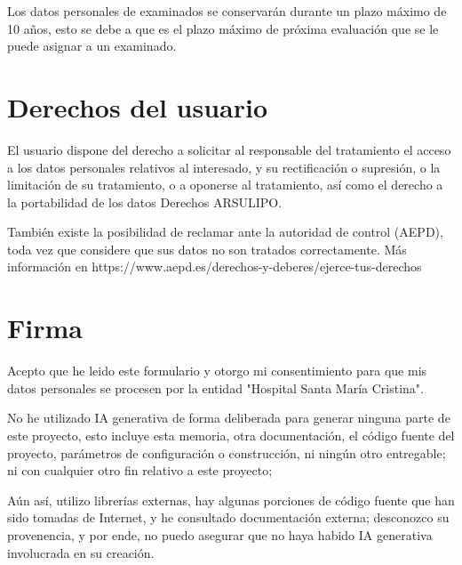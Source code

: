 \documentclass[12pt,a4paper,twoside,openright]{book}
\begin{document}
\begin{umaappendices}
Los datos personales de examinados se conservarán durante un plazo máximo de 10 años, esto se debe a que es el plazo máximo de próxima evaluación que se le puede asignar a un examinado.

\section{Derechos del usuario}

El usuario dispone del derecho a solicitar al responsable del tratamiento el acceso a los datos personales relativos al interesado, y su rectificación o supresión, o la limitación de su tratamiento, o a oponerse al tratamiento, así como el derecho a la portabilidad de los datos Derechos ARSULIPO.

También existe la posibilidad  de reclamar ante la autoridad de control (AEPD), toda vez que considere que sus datos no son tratados correctamente. Más información en https://www.aepd.es/derechos-y-deberes/ejerce-tus-derechos

\section{Firma}

Acepto que he leido este formulario y otorgo mi consentimiento para que mis datos personales se procesen por la entidad "Hospital Santa María Cristina".


No he utilizado IA generativa de forma deliberada para generar ninguna parte de este proyecto, esto incluye esta memoria, otra documentación, el código fuente del proyecto, parámetros de configuración o construcción, ni ningún otro entregable; ni con cualquier otro fin relativo a este proyecto; 

Aún así, utilizo librerías externas, hay algunas porciones de código fuente que han sido tomadas de Internet, y he consultado documentación externa; desconozco su provenencia, y por ende, no puedo asegurar que no haya habido IA generativa involucrada en su creación.

\end{umaappendices}

\backmatter
\printbibliography[title={Bibliografía}]
\cleardoublepage
\MakeUMABackCover
\end{document}
